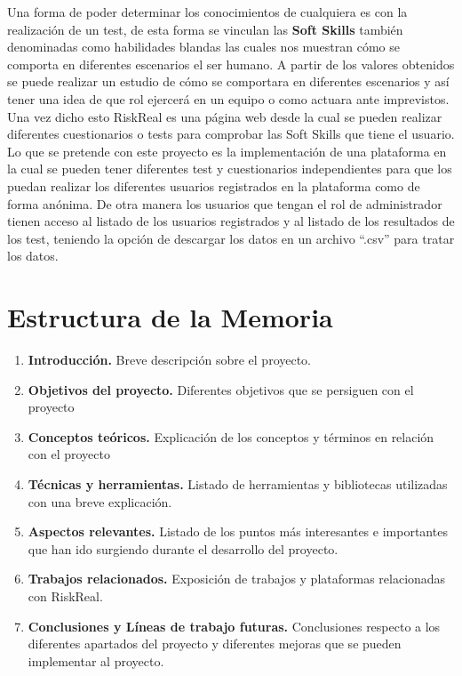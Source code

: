 
Una forma de poder determinar los conocimientos de cualquiera es con la realización de un test, de esta forma se vinculan las \textbf{Soft Skills} también denominadas como habilidades blandas las cuales nos muestran cómo se comporta en diferentes escenarios el ser humano.
A partir de los valores obtenidos se puede realizar un estudio de cómo se comportara en diferentes escenarios y así tener una idea de que rol ejercerá en un equipo o como actuara ante imprevistos.
Una vez dicho esto RiskReal es una página web desde la cual se pueden realizar diferentes cuestionarios o tests para comprobar las Soft Skills que tiene el usuario.
Lo que se pretende con este proyecto es la implementación de una plataforma en la cual se pueden tener diferentes test y cuestionarios independientes para que los puedan realizar los diferentes usuarios registrados en la plataforma como de forma anónima.
De otra manera los usuarios que tengan el rol de administrador tienen acceso al listado de los usuarios registrados y al listado de los resultados de los test, teniendo la opción de descargar los datos en un archivo “.csv” para tratar los datos.


\section{Estructura de la Memoria}
\begin{enumerate}
    \item \textbf{Introducción.} Breve descripción sobre el proyecto.
    \item \textbf{Objetivos del proyecto.} Diferentes objetivos que se persiguen con el proyecto
    \item \textbf{Conceptos teóricos.} Explicación de los conceptos y términos en relación con el proyecto
    \item \textbf{Técnicas y herramientas.} Listado de herramientas y bibliotecas utilizadas con una breve explicación.
    \item \textbf{Aspectos relevantes.} Listado de los puntos más interesantes e importantes que han ido surgiendo durante el desarrollo del proyecto.
    \item \textbf{Trabajos relacionados.} Exposición de trabajos y plataformas relacionadas con RiskReal.
    \item \textbf{Conclusiones y Líneas de trabajo futuras.} Conclusiones respecto a los diferentes apartados del proyecto y diferentes mejoras que se pueden implementar al proyecto.
\end{enumerate}

